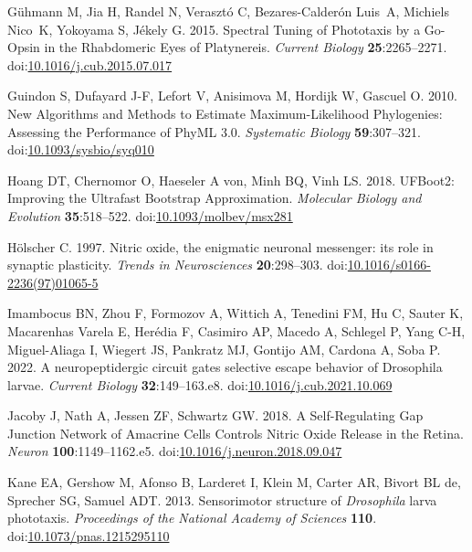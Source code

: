 \documentclass[
  10pt,
  onecolumn]{article}
\newlength{\cslhangindent}
\newlength{\cslentryspacingunit} %
\newenvironment{CSLReferences}[2] %
 {%
  \setlength{\parindent}{0pt}
  \ifodd #1
  \let\oldpar\par
  \def\par{\hangindent=\cslhangindent\oldpar}
  \fi
  \setlength{\parskip}{#2\cslentryspacingunit}
 }%
 {}
\begin{document}
\begin{CSLReferences}{1}{0}
\leavevmode{}%
Gühmann M, Jia H, Randel N, Verasztó C, Bezares-Calderón Luis~A,
Michiels Nico~K, Yokoyama S, Jékely G. 2015. Spectral Tuning of
Phototaxis by a Go-Opsin in the Rhabdomeric Eyes of Platynereis.
\emph{Current Biology} \textbf{25}:2265--2271.
doi:\href{https://doi.org/10.1016/j.cub.2015.07.017}{10.1016/j.cub.2015.07.017}

\leavevmode{}%
Guindon S, Dufayard J-F, Lefort V, Anisimova M, Hordijk W, Gascuel O.
2010. New Algorithms and Methods to Estimate Maximum-Likelihood
Phylogenies: Assessing the Performance of PhyML 3.0. \emph{Systematic
Biology} \textbf{59}:307--321.
doi:\href{https://doi.org/10.1093/sysbio/syq010}{10.1093/sysbio/syq010}

\leavevmode{}%
Hoang DT, Chernomor O, Haeseler A von, Minh BQ, Vinh LS. 2018. UFBoot2:
Improving the Ultrafast Bootstrap Approximation. \emph{Molecular Biology
and Evolution} \textbf{35}:518--522.
doi:\href{https://doi.org/10.1093/molbev/msx281}{10.1093/molbev/msx281}

\leavevmode{}%
Hölscher C. 1997. Nitric oxide, the enigmatic neuronal messenger: its
role in synaptic plasticity. \emph{Trends in Neurosciences}
\textbf{20}:298--303.
doi:\href{https://doi.org/10.1016/s0166-2236(97)01065-5}{10.1016/s0166-2236(97)01065-5}

\leavevmode{}%
Imambocus BN, Zhou F, Formozov A, Wittich A, Tenedini FM, Hu C, Sauter
K, Macarenhas Varela E, Herédia F, Casimiro AP, Macedo A, Schlegel P,
Yang C-H, Miguel-Aliaga I, Wiegert JS, Pankratz MJ, Gontijo AM, Cardona
A, Soba P. 2022. A neuropeptidergic circuit gates selective escape
behavior of Drosophila larvae. \emph{Current Biology}
\textbf{32}:149--163.e8.
doi:\href{https://doi.org/10.1016/j.cub.2021.10.069}{10.1016/j.cub.2021.10.069}

\leavevmode{}%
Jacoby J, Nath A, Jessen ZF, Schwartz GW. 2018. A Self-Regulating Gap
Junction Network of Amacrine Cells Controls Nitric Oxide Release in the
Retina. \emph{Neuron} \textbf{100}:1149--1162.e5.
doi:\href{https://doi.org/10.1016/j.neuron.2018.09.047}{10.1016/j.neuron.2018.09.047}

\leavevmode{}%
Kane EA, Gershow M, Afonso B, Larderet I, Klein M, Carter AR, Bivort BL
de, Sprecher SG, Samuel ADT. 2013. Sensorimotor structure of
{\emph{Drosophila}} larva phototaxis. \emph{Proceedings of the National
Academy of Sciences} \textbf{110}.
doi:\href{https://doi.org/10.1073/pnas.1215295110}{10.1073/pnas.1215295110}


\end{CSLReferences}
\end{document}
